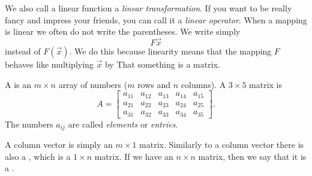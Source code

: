 We also call a linear function a
\emph{linear transformation}.
If you want to be really fancy and impress your friends, you can call it a
\emph{linear operator}.
When a mapping is linear we often do not write the parentheses.  We write
simply
\begin{equation*}
F \vec{x}
\end{equation*}
instead of $F(\vec{x})$.  We do this because linearity means that the
mapping $F$
behaves like multiplying $\vec{x}$ by 
That something is a matrix.

A \emph{}
is an $m
\times n$ array of numbers ($m$ rows and $n$ columns).  A
$3 \times 5$ matrix is
\begin{equation*}
A = 
\begin{bmatrix}
a_{11} & a_{12} & a_{13} & a_{14} & a_{15} \\
a_{21} & a_{22} & a_{23} & a_{24} & a_{25} \\
a_{31} & a_{32} & a_{33} & a_{34} & a_{35}
\end{bmatrix} .
\end{equation*}
The numbers $a_{ij}$ are called \emph{elements}
or \emph{entries}.

A column vector is simply an $m \times 1$ matrix.  Similarly to
a column vector there is also a 
\emph{}, which is a $1 \times n$ matrix.
If we have an $n \times n$ matrix, then we say that it is a
\emph{}.

